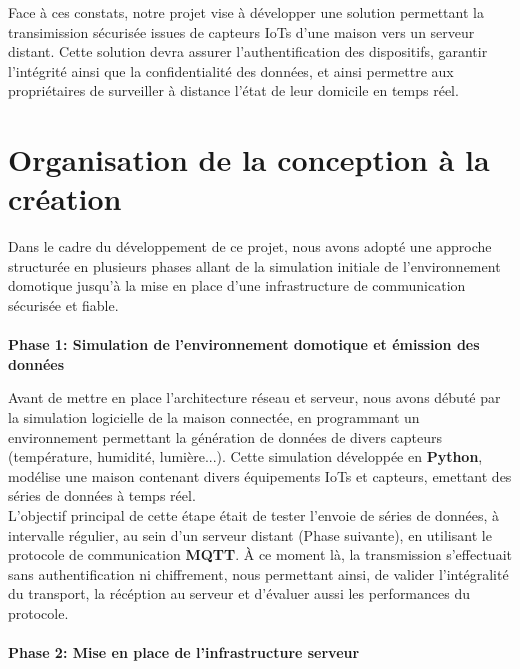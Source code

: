 \documentclass[10pt, a4paper]{report}
\begin{document}
		Face à ces constats, notre projet vise à développer une solution permettant la transimission sécurisée issues de capteurs IoTs d'une maison vers un serveur distant. Cette solution devra assurer l'authentification des dispositifs, garantir l'intégrité ainsi que la confidentialité des données, et ainsi permettre aux propriétaires de surveiller à distance l'état de leur domicile en temps réel.
	\section{Organisation de la conception à la création}
	Dans le cadre du développement de ce projet, nous avons adopté une approche structurée en plusieurs phases allant de la simulation initiale de l'environnement domotique jusqu'à la mise en place d'une infrastructure de communication sécurisée et fiable.\\\\
	\textbf{Phase 1: Simulation de l'environnement domotique et émission des données}
	
	Avant de mettre en place l'architecture réseau et serveur, nous avons débuté par la simulation logicielle de la maison connectée, en programmant un environnement permettant la génération de données de divers capteurs (température, humidité, lumière...). Cette simulation développée en \textbf{Python}, modélise une maison contenant divers équipements IoTs et capteurs, emettant des séries de données à temps réel.\\
	L'objectif principal de cette étape était de tester l'envoie de séries de données, à intervalle régulier, au sein d'un serveur distant (Phase suivante), en utilisant le protocole de communication \textbf{MQTT}. À ce moment là, la transmission s'effectuait sans authentification ni chiffrement, nous permettant ainsi, de valider l'intégralité du transport, la récéption au serveur et d'évaluer aussi les performances du protocole. \\\\
	\textbf{Phase 2: Mise en place de l'infrastructure serveur}
	
\end{document}
